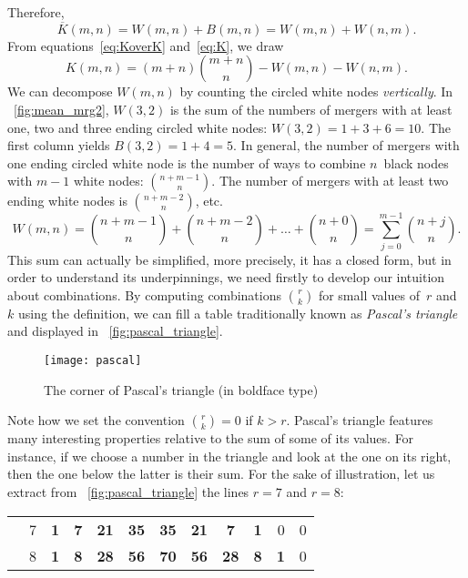 Therefore,
\begin{equation}
\overline{K}(m,n) = W(m,n) + B(m,n) = W(m,n) + W(n,m).
\label{eq:K}
\end{equation}
From equations~\eqref{eq:KoverK} and~\eqref{eq:K}, we draw
\begin{equation}
K(m,n) = (m + n) \binom{m+n}{n} - W(m,n) - W(n,m).
\label{eq:K_temp}
\end{equation}
We can decompose \(W(m,n)\) by counting the circled white nodes
\emph{vertically}. In \fig~\ref{fig:mean_mrg2}, \(W(3,2)\) is the sum
of the numbers of mergers with at least one, two and three ending
circled white nodes: \(W(3,2) = 1 + 3 + 6 = 10\). The first column
yields \(B(3,2) = 1 + 4 = 5\). In general, the number of mergers with
one ending circled white node is the number of ways to combine
\(n\)~black nodes with \(m-1\) white nodes: \(\binom{n+m-1}{n}\). The
number of mergers with at least two ending white nodes is
\(\binom{n+m-2}{n}\), etc.
\begin{equation*}
W(m,n)
  = \binom{n+m-1}{n} + \binom{n+m-2}{n} + \dots + \binom{n+0}{n}
  = \!\sum_{j=0}^{m-1}{\!\binom{n+j}{n}}.
\end{equation*}
This sum can actually be simplified, more precisely, it has a closed
form, but in order to understand its underpinnings, we need firstly to
develop our intuition about combinations. By computing combinations
\(\binom{r}{k}\) for small values of~\(r\) and~\(k\) using the
definition, we can fill a table traditionally known as \emph{Pascal's
  triangle} and displayed in
\fig~\vref{fig:pascal_triangle}.
\begin{figure}
\centering
\texttt{[image: pascal]}
\caption{The corner of Pascal's triangle (in boldface type)}
\label{fig:pascal_triangle}
\end{figure}
Note how we set the convention \(\binom{r}{k} = 0\) if \(k >
r\). Pascal's triangle features many interesting properties relative
to the sum of some of its values. For instance, if we choose a number
in the triangle and look at the one on its right, then the one below
the latter is their sum. For the sake of illustration, let us extract
from \fig~\vref{fig:pascal_triangle} the lines \(r=7\) and \(r=8\):
\begin{center}
\begin{tabular}{||c|c||rrrrrrrrrr||}
\cline{5-6}\cline{8-9}
      & 7 & \textbf{1} & \textbf{7} & \multicolumn{1}{|c}{\textbf{21}} & \multicolumn{1}{c|}{\textbf{35}} &  \textbf{35} &  \multicolumn{1}{|c}{\textbf{21}} & \multicolumn{1}{c|}{\textbf{7}} &  \textbf{1} & 0 & 0\\
\cline{5-5}\cline{8-8}
      & 8 & \textbf{1} & \textbf{8} & \textbf{28} & \multicolumn{1}{|c|}{\textbf{56}} &  \textbf{70} &  \textbf{56} & \multicolumn{1}{|c|}{\textbf{28}} &  \textbf{8} & \textbf{1} & 0\\
\cline{6-6}\cline{9-9}
\end{tabular}
\end{center}
